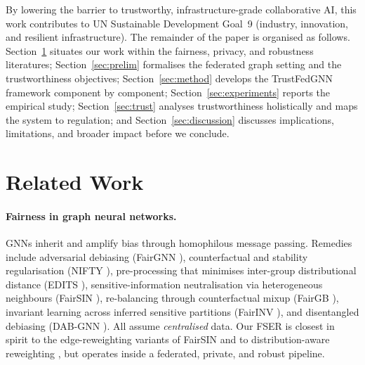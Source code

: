 \documentclass[pdflatex,sn-mathphys-num]{sn-jnl}
\theoremstyle{thmstyleone}%
\theoremstyle{thmstyletwo}%
\theoremstyle{thmstylethree}%
\begin{document}
By lowering the barrier to trustworthy, infrastructure-grade collaborative AI,
this work contributes to UN Sustainable Development Goal~9 (industry,
innovation, and resilient infrastructure). The remainder of the paper is
organised as follows. Section~\ref{sec:related} situates our work within the
fairness, privacy, and robustness literatures; Section~\ref{sec:prelim}
formalises the federated graph setting and the trustworthiness objectives;
Section~\ref{sec:method} develops the TrustFedGNN framework component by
component; Section~\ref{sec:experiments} reports the empirical study;
Section~\ref{sec:trust} analyses trustworthiness holistically and maps the
system to regulation; and Section~\ref{sec:discussion} discusses implications,
limitations, and broader impact before we conclude.

\section{Related Work}
\label{sec:related}

\paragraph{Fairness in graph neural networks.}
GNNs inherit and amplify bias through homophilous message passing. Remedies
include adversarial debiasing (FairGNN \cite{dai2021say}), counterfactual and
stability regularisation (NIFTY \cite{agarwal2021nifty}), pre-processing that
minimises inter-group distributional distance (EDITS \cite{dong2022edits}),
sensitive-information neutralisation via heterogeneous neighbours (FairSIN
\cite{yang2024fairsin}), re-balancing through counterfactual mixup (FairGB
\cite{li2024fairgb}), invariant learning across inferred sensitive partitions
(FairINV \cite{zhu2024fairinv}), and disentangled debiasing (DAB-GNN
\cite{lee2025dabgnn}). All assume \emph{centralised} data. Our FSER is closest
in spirit to the edge-reweighting variants of FairSIN and to distribution-aware
reweighting \cite{fnrgnn2025}, but operates inside a federated, private, and
robust pipeline.
\end{document}
